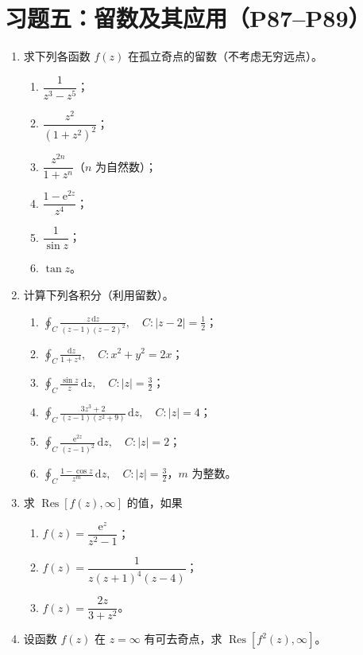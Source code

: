 \documentclass[UTF8,11pt,a4paper]{ctexart}
\newcommand{\dd}{\,\mathrm{d}}
\newcommand{\ee}{\mathrm{e}}
\newcommand{\Res}{\operatorname{Res}}
\begin{document}
\section{习题五：留数及其应用（P87--P89）}

\begin{enumerate}
\item 求下列各函数 $f(z)$ 在孤立奇点的留数（不考虑无穷远点）。
  \begin{enumerate}
  \item $\dfrac1{z^3-z^5}$；
  \item $\dfrac{z^2}{(1+z^2)^2}$；
  \item $\dfrac{z^{2n}}{1+z^n}$（$n$ 为自然数）；
  \item $\dfrac{1-\ee^{2z}}{z^4}$；
  \item $\dfrac1{\sin z}$；
  \item $\tan z$。
  \end{enumerate}

\item 计算下列各积分（利用留数）。
  \begin{enumerate}
  \item $\displaystyle\oint_C\frac{z\dd z}{(z-1)(z-2)^2},\quad C:|z-2|=\frac12$；
  \item $\displaystyle\oint_C\frac{\dd z}{1+z^4},\quad C:x^2+y^2=2x$；
  \item $\displaystyle\oint_C\frac{\sin z}{z}\dd z,\quad C:|z|=\frac32$；
  \item $\displaystyle\oint_C\frac{3z^3+2}{(z-1)(z^2+9)}\dd z,\quad C:|z|=4$；
  \item $\displaystyle\oint_C\frac{\ee^{2z}}{(z-1)^2}\dd z,\quad C:|z|=2$；
  \item $\displaystyle\oint_C\frac{1-\cos z}{z^m}\dd z,\quad C:|z|=\frac32$，$m$ 为整数。
  \end{enumerate}

\item 求 $\Res[f(z),\infty]$ 的值，如果
  \begin{enumerate}
  \item $f(z)=\dfrac{\ee^z}{z^2-1}$；
  \item $f(z)=\dfrac1{z(z+1)^4(z-4)}$；
  \item $f(z)=\dfrac{2z}{3+z^2}$。
  \end{enumerate}

\item 设函数 $f(z)$ 在 $z=\infty$ 有可去奇点，求 $\Res[f^2(z),\infty]$。


\end{enumerate}
\end{document}
